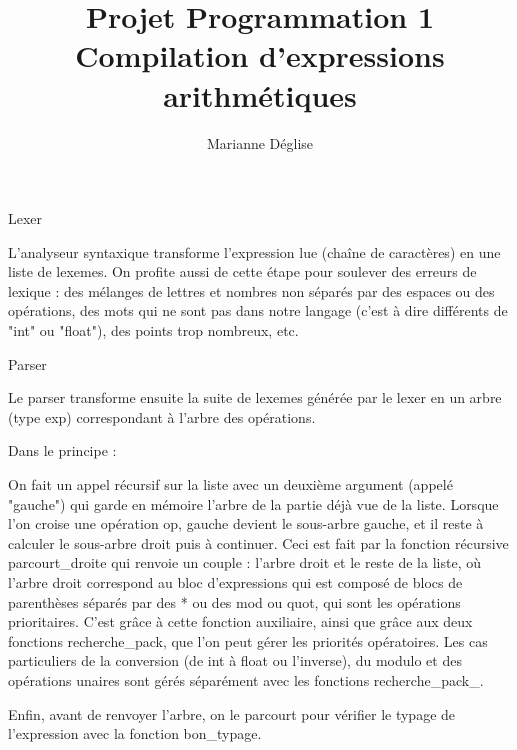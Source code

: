 \documentclass{article}
\author{Marianne Déglise}
\title{Projet Programmation 1\\
Compilation d'expressions arithmétiques}
\date{}
\theoremstyle{definition}
\begin{document}
\maketitle

\begin{section}{Lexer}

L'analyseur syntaxique transforme l'expression lue (chaîne de caractères) en une liste de lexemes.
On profite aussi de cette étape pour soulever des erreurs de lexique : des mélanges de lettres et nombres non séparés par des espaces ou des opérations, des mots qui ne sont pas dans notre langage (c'est à dire différents de "int" ou "float"), des points trop nombreux, etc.

\end{section}

\begin{section}{Parser}

Le parser transforme ensuite la suite de lexemes générée par le lexer en un arbre (type exp) correspondant à l'arbre des opérations.

\vspace{0.2 cm}

Dans le principe : 

On fait un appel récursif sur la liste avec un deuxième argument (appelé "gauche") qui garde en mémoire l'arbre de la partie déjà vue de la liste. 
Lorsque l'on croise une opération op, gauche devient le sous-arbre gauche, et il reste à calculer le sous-arbre droit puis à continuer. 
Ceci est fait par la fonction récursive parcourt\_droite qui renvoie un couple : 
l'arbre droit et le reste de la liste, où l'arbre droit correspond au bloc d'expressions qui est composé de blocs de parenthèses séparés par des * ou des mod ou quot, 
qui sont les opérations prioritaires. 
C'est grâce à cette fonction auxiliaire, ainsi que grâce aux deux fonctions recherche\_pack, que l'on peut gérer les priorités opératoires. 
Les cas particuliers de la conversion (de int à float ou l'inverse), 
du modulo et des opérations unaires sont gérés séparément avec les fonctions recherche\_pack\_.

Enfin, avant de renvoyer l'arbre, on le parcourt pour vérifier le typage de l'expression avec la fonction bon\_typage.

\end{section}
\end{document}
